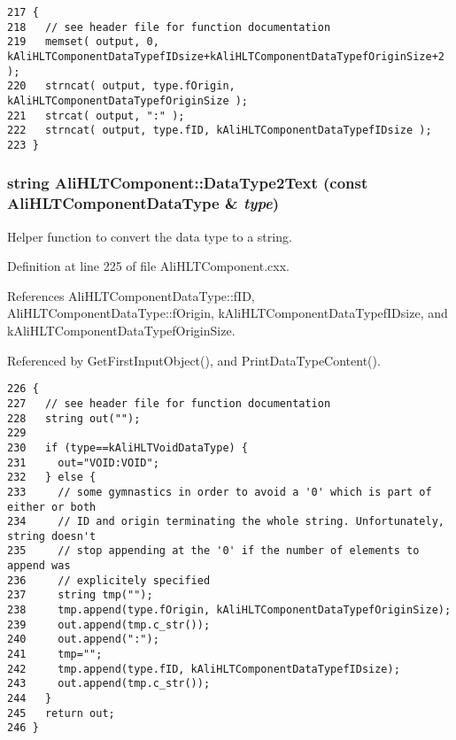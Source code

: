 \footnotesize\begin{verbatim}217 {
218   // see header file for function documentation
219   memset( output, 0, kAliHLTComponentDataTypefIDsize+kAliHLTComponentDataTypefOriginSize+2 );
220   strncat( output, type.fOrigin, kAliHLTComponentDataTypefOriginSize );
221   strcat( output, ":" );
222   strncat( output, type.fID, kAliHLTComponentDataTypefIDsize );
223 }
\end{verbatim}\normalsize 


\subsubsection{\setlength{\rightskip}{0pt plus 5cm}string Ali\-HLTComponent::Data\-Type2Text (const {\bf Ali\-HLTComponent\-Data\-Type} \& {\em type})\hspace{0.3cm}{\tt  [static]}}\label{classAliHLTComponent_e2}


Helper function to convert the data type to a string. 

Definition at line 225 of file Ali\-HLTComponent.cxx.

References Ali\-HLTComponent\-Data\-Type::f\-ID, Ali\-HLTComponent\-Data\-Type::f\-Origin, k\-Ali\-HLTComponent\-Data\-Typef\-IDsize, and k\-Ali\-HLTComponent\-Data\-Typef\-Origin\-Size.

Referenced by Get\-First\-Input\-Object(), and Print\-Data\-Type\-Content().

\footnotesize\begin{verbatim}226 {
227   // see header file for function documentation
228   string out("");
229   
230   if (type==kAliHLTVoidDataType) {
231     out="VOID:VOID";
232   } else {
233     // some gymnastics in order to avoid a '0' which is part of either or both
234     // ID and origin terminating the whole string. Unfortunately, string doesn't
235     // stop appending at the '0' if the number of elements to append was 
236     // explicitely specified
237     string tmp("");
238     tmp.append(type.fOrigin, kAliHLTComponentDataTypefOriginSize);
239     out.append(tmp.c_str());
240     out.append(":");
241     tmp="";
242     tmp.append(type.fID, kAliHLTComponentDataTypefIDsize);
243     out.append(tmp.c_str());
244   }
245   return out;
246 }
\end{verbatim}\normalsize 


